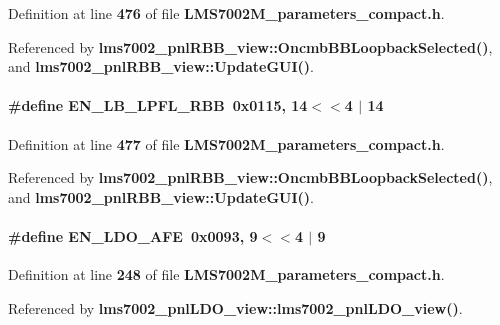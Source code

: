 Definition at line {\bf 476} of file {\bf L\+M\+S7002\+M\+\_\+parameters\+\_\+compact.\+h}.



Referenced by {\bf lms7002\+\_\+pnl\+R\+B\+B\+\_\+view\+::\+Oncmb\+B\+B\+Loopback\+Selected()}, and {\bf lms7002\+\_\+pnl\+R\+B\+B\+\_\+view\+::\+Update\+G\+U\+I()}.

\paragraph[{E\+N\+\_\+\+L\+B\+\_\+\+L\+P\+F\+L\+\_\+\+R\+BB}]{\setlength{\rightskip}{0pt plus 5cm}\#define E\+N\+\_\+\+L\+B\+\_\+\+L\+P\+F\+L\+\_\+\+R\+BB~0x0115, 14$<$$<$4 $\vert$  14}\label{LMS7002M__parameters__compact_8h_a876aadac587ce18dbe2d497dcdb05994}


Definition at line {\bf 477} of file {\bf L\+M\+S7002\+M\+\_\+parameters\+\_\+compact.\+h}.



Referenced by {\bf lms7002\+\_\+pnl\+R\+B\+B\+\_\+view\+::\+Oncmb\+B\+B\+Loopback\+Selected()}, and {\bf lms7002\+\_\+pnl\+R\+B\+B\+\_\+view\+::\+Update\+G\+U\+I()}.

\paragraph[{E\+N\+\_\+\+L\+D\+O\+\_\+\+A\+FE}]{\setlength{\rightskip}{0pt plus 5cm}\#define E\+N\+\_\+\+L\+D\+O\+\_\+\+A\+FE~0x0093, 9$<$$<$4 $\vert$  9}\label{LMS7002M__parameters__compact_8h_ab60b42337f37e259d3fa24656e842b58}


Definition at line {\bf 248} of file {\bf L\+M\+S7002\+M\+\_\+parameters\+\_\+compact.\+h}.



Referenced by {\bf lms7002\+\_\+pnl\+L\+D\+O\+\_\+view\+::lms7002\+\_\+pnl\+L\+D\+O\+\_\+view()}.

